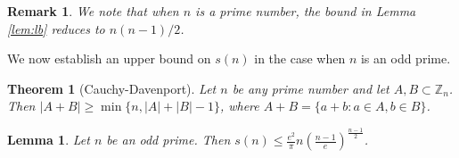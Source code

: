 \documentclass[12pt]{article}
\newcommand{\mb}{\mathbb}
\newtheorem{lemma}[defn]{{\bf Lemma}}
\newtheorem{theo}[defn]{{\bf Theorem}}
\newtheorem{remark}[defn]{{\bf Remark}}
\begin{document}
\begin{remark}{\rm 
We note that when $n$ is a prime number, the bound in Lemma \ref{lem:lb}
reduces to $n(n-1)/2$. 
}
\end{remark}


We now establish an upper bound on $s(n)$ in the case when $n$ is an odd
prime. 

\begin{theo}[Cauchy-Davenport]
\label{theoremCauchyDavenport}
Let $n$ be any prime number and let $A, B \subset \mb{Z}_n$. Then $|A + B| \geq \min\{n, |A| + |B| - 1 \}$, where $A + B =\{a + b : a \in A, b\in B \}$.
\end{theo}


\begin{lemma}\label{lem:ub}
Let $n$ be an odd prime. Then $s(n)\leq \frac{e^2}{\pi} n \left(\frac{n-1}{e}\right)^\frac{n-1}{2}$.
\end{lemma}
\end{document}
